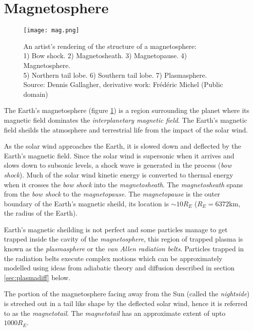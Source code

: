 \section{Magnetosphere}\label{sec:mag}

\begin{figure}
    \noindent\texttt{[image: mag.png]}
    \caption{\small{An artist's rendering of the structure of a magnetosphere: \\
    1) Bow shock. 2) Magnetosheath. 3) Magnetopause. 4) Magnetosphere. \\
    5) Northern tail lobe. 6) Southern tail lobe. 7) Plasmasphere.\\ 
    Source: Dennis Gallagher, derivative work: Fr\'ed\'eric Michel (Public domain)}
    }
    \label{fig:magnetosphere}
\end{figure}

The Earth's magnetosphere (figure \ref{fig:magnetosphere}) is a region surrounding the planet where its magnetic field 
dominates the \emph{interplanetary magnetic field}. The Earth's magnetic field sheilds the atmosphere and terrestrial life 
from the impact of the solar wind. 

As the solar wind approaches the Earth, it is slowed down and deflected by the Earth's magnetic field. Since the 
solar wind is supersonic when it arrives and slows down to subsonic levels, a shock wave is generated in the 
process (\emph{bow shock}). Much of the solar wind kinetic energy is converted to thermal energy when it crosses 
the \emph{bow shock} into the \emph{magnetosheath}. The \emph{magnetosheath} spans from the \emph{bow shock} to 
the \emph{magnetopause}. The \emph{magnetopause} is the outer boundary of the Earth's magnetic sheild, its location 
is $\sim 10R_E$ ($R_E = 6372 \text{km}$, the radius of the Earth). 

Earth's magnetic sheilding is not perfect and some particles manage to get trapped inside the cavity of the 
\emph{magnetosphere}, this region of trapped plasma is known as the \emph{plasmasphere} or the \emph{van Allen 
radiation belts}. Particles trapped in the radiation belts execute complex motions which can be approximately 
modelled using ideas from adiabatic theory and diffusion described in section \ref{sec:plasmadiff} below. 

The portion of the magnetosphere facing away from the Sun (called the \emph{nightside}) is streched out in  
a tail like shape by the deflected solar wind, hence it is referred to as the \emph{magnetotail}. The 
\emph{magnetotail} has an approximate extent of upto $1000R_E$.


